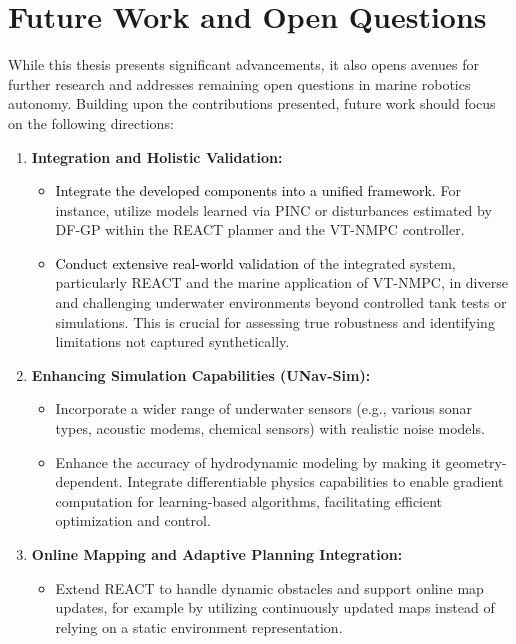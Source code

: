 \section{Future Work and Open Questions}
\label{sec:future_work}

While this thesis presents significant advancements, it also opens avenues for further research and addresses remaining open questions in marine robotics autonomy. Building upon the contributions presented, future work should focus on the following directions:

\begin{enumerate}
    \item \textbf{Integration and Holistic Validation:}
        \begin{itemize}
            \item \textcolor{black}{Integrate the developed components into a unified framework.} For instance, utilize models learned via PINC or disturbances estimated by DF-GP within the REACT planner and the VT-NMPC controller.
            \item \textcolor{black}{Conduct extensive real-world validation} of the integrated system, particularly REACT and the marine application of VT-NMPC, in diverse and challenging underwater environments beyond controlled tank tests or simulations. This is crucial for assessing true robustness and identifying limitations not captured synthetically.
        \end{itemize}

    \item \textbf{Enhancing Simulation Capabilities (UNav-Sim):}
        \begin{itemize}
            \item Incorporate a wider range of underwater sensors (e.g., various sonar types, acoustic modems, chemical sensors) with realistic noise models.
        
           \item Enhance the accuracy of hydrodynamic modeling by making it geometry-dependent. Integrate differentiable physics capabilities to enable gradient computation for learning-based algorithms, facilitating efficient optimization and control.

        \end{itemize}

\item \textbf{Online Mapping and Adaptive Planning Integration:}
    \begin{itemize}
        \item Extend REACT to handle dynamic obstacles and support online map updates, for example by utilizing continuously updated maps instead of relying on a static environment representation.
        

\end{itemize}
\end{enumerate}
